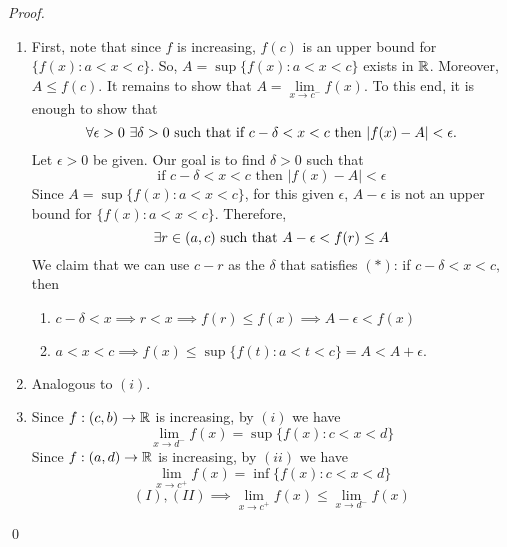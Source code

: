 \begin{proof}
    \begin{enumerate}[$(i)$]
        \item First, note that since $f$ is increasing, $f(c)$ is an upper bound for $\{f(x) : a < x < c\}$. So, $A=\sup \{f(x) : a < x < c\}$ exists in $\mathbb{R}$. Moreover, $A \leq f(c).$ It remains to show that $A = \lim \limits_{x \to c^-} f(x).$ To this end, it is enough to show that
        $$
    \forall \epsilon > 0 ~\exists \delta > 0 \text{ such that } \text{if $c-\delta < x < c$ then $|f(x) - A| < \epsilon $.}
        $$
        Let $\epsilon > 0$ be given. Our goal is to find $\delta > 0$ such that 
        \begin{equation*}
            \text{if $c - \delta < x < c$ then $|f(x) - A| < \epsilon $} \tag{$*$}
        \end{equation*}
        Since $A = \sup \{f(x) : a < x < c\}$, for this given $\epsilon$, $A - \epsilon$ is not an upper bound for $\{f(x): a < x <c\}$. Therefore,
        $$
        \exists r \in (a, c) \text{ such that } A - \epsilon < f(r) \leq A
        $$
        We claim that we can use $c - r$ as the $\delta$ that satisfies $(*)$: if $c - \delta < x < c,$ then
        \begin{enumerate}[$(1)$]
            \item $c - \delta < x \implies r < x \implies f(r) \leq f(x) \implies A - \epsilon < f(x)$
            \item $a < x < c \implies f(x) \leq \sup \{f(t) : a < t < c\} = A < A + \epsilon.$
        \end{enumerate}
        
        \item Analogous to $(i)$.
        
        \item Since $f:(c,b) \to \mathbb{R}$ is increasing, by $(i)$ we have
        \begin{equation}
            \lim \limits_{x \to d^-} f(x) = \sup \{f(x) : c < x < d\}
            \tag{$I$}
        \end{equation}
        Since $f: (a, d) \to \mathbb{R}$ is increasing, by $(ii)$ we have
        \begin{equation}
            \lim \limits_{x \to c^+} f(x) = \inf \{f(x) : c < x < d\}
            \tag{$II$}
        \end{equation}
        $$
        (I), (II) \implies \lim \limits_{x \to c^+} f(x) \leq \lim \limits_{x \to d^-} f(x)
        $$
    \end{enumerate}
    \qed
\end{proof}

